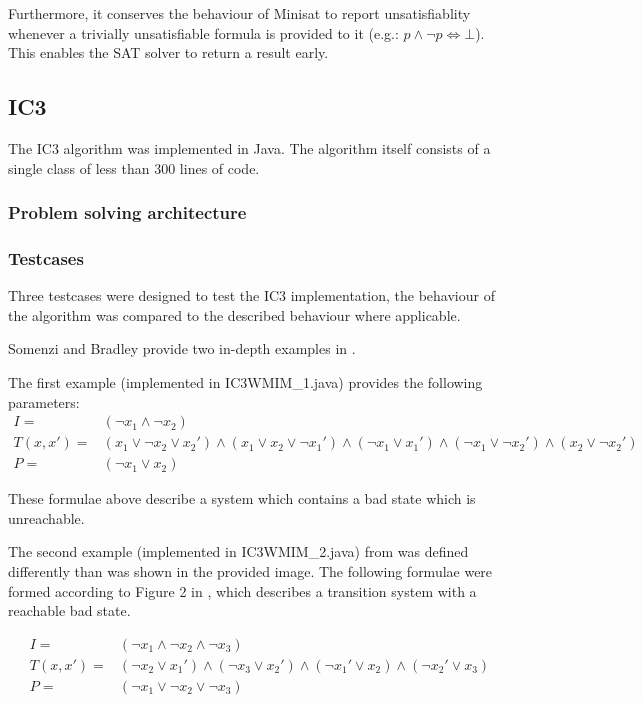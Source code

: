 \documentclass[a4paper]{article}
\begin{document}
Furthermore, it conserves the behaviour of Minisat to report unsatisfiablity whenever a trivially unsatisfiable formula is provided to it (e.g.: $p \land \lnot p \Leftrightarrow \bot$). This enables the SAT solver to return a result early.

\subsection{IC3}
The IC3 algorithm was implemented in Java. The algorithm itself consists of a single class of less than 300 lines of code.

\subsubsection{Problem solving architecture}

\subsubsection{Testcases}
\label{sec:ic3_testcases}
Three testcases were designed to test the IC3 implementation, the behaviour of the algorithm was compared to the described behaviour where applicable.

Somenzi and Bradley provide two in-depth examples in \cite{Somenzi2011}.

The first example (implemented in IC3WMIM\_1.java) provides the following parameters:
\begin{align*}
I =& (\lnot x_1 \land \lnot x_2)\\
T(x,x') =& (x_1 \lor \lnot x_2 \lor x_2') \land (x_1 \lor x_2 \lor \lnot x_1') \land (\lnot x_1 \lor x_1') \land (\lnot x_1 \lor \lnot x_2') \land (x_2 \lor \lnot x_2') \\
P =& (\lnot x_1 \lor x_2)
\end{align*}

These formulae above describe a system which contains a bad state which is unreachable.

The second example (implemented in IC3WMIM\_2.java) from \cite{Somenzi2011} was defined differently than was shown in the provided image.
The following formulae were formed according to Figure 2 in \cite{Somenzi2011}, which describes a transition system with a reachable bad state.

\begin{align*}
I =& (\lnot x_1 \land \lnot x_2 \land \lnot x_3)\\
T(x,x') =& (\lnot x_2 \lor x_1') \land (\lnot x_3 \lor x_2') \land (\lnot x_1' \lor x_2) \land (\lnot x_2' \lor x_3)\\
P =& (\lnot x_1 \lor \lnot x_2 \lor \lnot x_3)
\end{align*}
\end{document}
